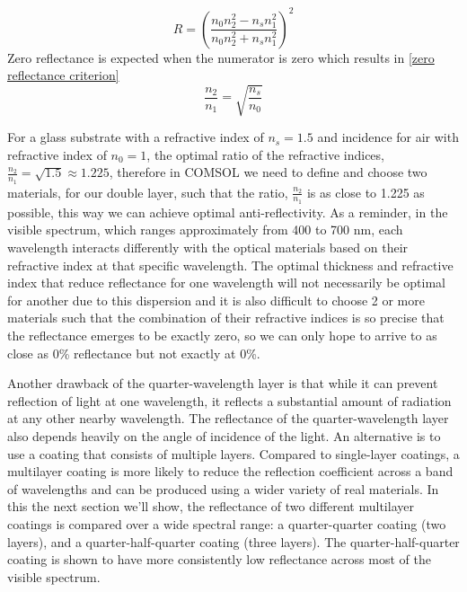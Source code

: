 \begin{equation}\label{reflectance for 2-layer antireflecting films - chap4}
    R = \left(\frac{n_0n_2^2 - n_sn_1^2}{n_0n_2^2 + n_sn_1^2}\right)^2
\end{equation}
Zero reflectance is expected when the numerator is zero which results in \ref{zero reflectance criterion}
\begin{equation}\label{zero reflectance criterion - chap4}
    \frac{n_2}{n_1} = \sqrt{\frac{n_s}{n_0}}
\end{equation}

For a glass substrate with a refractive index of $n_s = 1.5$ and incidence for air with refractive index of $n_0 = 1$, the optimal ratio of the refractive indices, $\frac{n_2}{n_1} = \sqrt{1.5} \approx 1.225$, therefore in COMSOL we need to define and choose two materials, for our double layer, such that the ratio, $\frac{n_2}{n_1}$ is as close to 1.225 as possible, this way we can achieve optimal anti-reflectivity. As a reminder, in the visible spectrum, which ranges approximately from 400 to 700 nm, each wavelength interacts differently with the optical materials based on their refractive index at that specific wavelength. The optimal thickness and refractive index that reduce reflectance for one wavelength will not necessarily be optimal for another due to this dispersion and it is also difficult to choose 2 or more materials such that the combination of their refractive indices is so precise that the reflectance emerges to be exactly zero, so we can only hope to arrive to as close as 0\% reflectance but not exactly at 0\%.

Another drawback of the quarter-wavelength layer is that while it can prevent reflection of light at one wavelength, it reflects a substantial amount of radiation at any other nearby wavelength. The reflectance of the quarter-wavelength layer also depends heavily on the angle of incidence of the light. An alternative is to use a coating that consists of multiple layers. Compared to single-layer coatings, a multilayer coating is more likely to reduce the reflection coefficient across a band of wavelengths and can be produced using a wider variety of real materials.
In this the next section we'll show, the reflectance of two different multilayer coatings is compared over a wide spectral range: a quarter-quarter coating (two layers), and a quarter-half-quarter coating (three layers). The quarter-half-quarter coating is shown to have more consistently low reflectance across most of the visible spectrum. %

